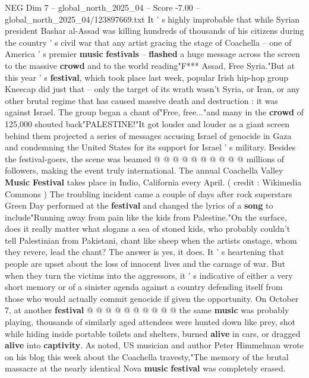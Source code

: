 \begin{textsample}{NEG Dim 7 – global\_north\_2025\_04 – Score -7.00 – global\_north\_2025\_04/123897669.txt}  \label{ex:f7_neg_097}
It ' s highly improbable that while Syrian president Bashar al-Assad was killing hundreds of thousands of his citizens during the country ' s civil war that any artist gracing the stage of Coachella -- one of America ' s premier \textbf{music} \textbf{festivals} -- \textbf{flashed} a huge message across the screen to the massive \textbf{crowd} and to the world reading"F*** Assad, Free Syria."But at this year ' s \textbf{festival}, which took place last week, popular Irish hip-hop group Kneecap did just that -- only the target of its wrath wasn't Syria, or Iran, or any other brutal regime that has caused massive death and destruction : it was against Israel.
The group began a chant of"Free, free..."and many in the \textbf{crowd} of 125,000 shouted back"PALESTINE!"It got louder and louder as a giant screen behind them projected a series of messages accusing Israel of genocide in Gaza and condemning the United States for its support for Israel ' s military.
Besides the festival-goers, the scene was beamed @ @ @ @ @ @ @ @ @ @ millions of followers, making the event truly international.
The annual Coachella Valley \textbf{Music} \textbf{Festival} takes place in Indio, California every April. ( credit : Wikimedia Commons ) The troubling incident came a couple of days after rock superstars Green Day performed at the \textbf{festival} and changed the lyrics of a \textbf{song} to include"Running away from pain like the kids from Palestine."On the surface, does it really matter what slogans a sea of stoned kids, who probably couldn't tell Palestinian from Pakistani, chant like sheep when the artists onstage, whom they revere, lead the chant?
The answer is yes, it does.
It ' s heartening that people are upset about the loss of innocent lives and the carnage of war.
But when they turn the victims into the aggressors, it ' s indicative of either a very short memory or of a sinister agenda against a country defending itself from those who would actually commit genocide if given the opportunity.
On October 7, at another \textbf{festival} @ @ @ @ @ @ @ @ @ @ the same \textbf{music} was probably playing, thousands of similarly aged attendees were hunted down like prey, shot while hiding inside portable toilets and shelters, burned \textbf{alive} in cars, or dragged \textbf{alive} into \textbf{captivity}.
As noted, US musician and author Peter Himmelman wrote on his blog this week about the Coachella travesty,"The memory of the brutal massacre at the nearly identical Nova \textbf{music} \textbf{festival} was completely erased.

\end{textsample}

